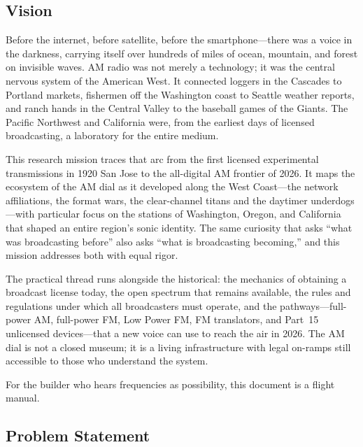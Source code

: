 \documentclass[11pt,letterpaper]{article}
\begin{document}
\subsection{Vision}

Before the internet, before satellite, before the smartphone---there was a voice in the darkness,
carrying itself over hundreds of miles of ocean, mountain, and forest on invisible waves.
AM radio was not merely a technology; it was the central nervous system of the American West.
It connected loggers in the Cascades to Portland markets, fishermen off the Washington coast to
Seattle weather reports, and ranch hands in the Central Valley to the baseball games of the Giants.
The Pacific Northwest and California were, from the earliest days of licensed broadcasting, a
laboratory for the entire medium.

This research mission traces that arc from the first licensed experimental transmissions in 1920
San Jose to the all-digital AM frontier of 2026. It maps the ecosystem of the AM dial as it
developed along the West Coast---the network affiliations, the format wars, the clear-channel
titans and the daytimer underdogs---with particular focus on the stations of Washington, Oregon,
and California that shaped an entire region's sonic identity. The same curiosity that asks
``what was broadcasting before'' also asks ``what is broadcasting becoming,'' and this mission
addresses both with equal rigor.

The practical thread runs alongside the historical: the mechanics of obtaining a broadcast
license today, the open spectrum that remains available, the rules and regulations under which
all broadcasters must operate, and the pathways---full-power AM, full-power FM, Low Power FM,
FM translators, and Part~15 unlicensed devices---that a new voice can use to reach the air in
2026. The AM dial is not a closed museum; it is a living infrastructure with legal on-ramps
still accessible to those who understand the system.

For the builder who hears frequencies as possibility, this document is a flight manual.

\subsection{Problem Statement}
\end{document}

